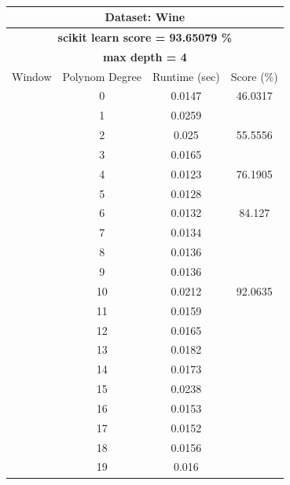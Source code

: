 \documentclass{article}
\begin{document}
\begin{multicols}{2}
\begin{table}[H]
\caption{}
\label{tab:my-table}
\begin{tabular}{|c|c|c|c|}
\hline
\multicolumn{4}{|c|}{\textbf{Dataset: Wine}} \\ \hline
\multicolumn{4}{|c|}{\textbf{scikit learn score = 93.65079 \%}} \\ \hline
\multicolumn{4}{|c|}{\textbf{max depth = 4}} \\ \hline
Window & Polynom Degree & Runtime (sec) & Score (\%) \\ \hline
 & 0 & 0.0147 & 46.0317 \\ \cline{2-4} 
 & 1 & 0.0259 &  \\ \cline{2-3}
 & 2 & 0.025 & \multirow{-2}{*}{55.5556} \\ \cline{2-4} 
 & 3 & 0.0165 &  \\ \cline{2-3}
 & 4 & 0.0123 & \multirow{-2}{*}{76.1905} \\ \cline{2-4} 
 & 5 & 0.0128 &  \\ \cline{2-3}
 & 6 & 0.0132 & \multirow{-2}{*}{84.127} \\ \cline{2-4} 
 & 7 & 0.0134 &  \\ \cline{2-3}
 & 8 & 0.0136 &  \\ \cline{2-3}
 & 9 & 0.0136 &  \\ \cline{2-3}
 & 10 & 0.0212 & \multirow{-4}{*}{92.0635} \\ \cline{2-4} 
 & \cellcolor[HTML]{FFFFC7}11 & \cellcolor[HTML]{FFFFC7}0.0159 & \cellcolor[HTML]{FFFFC7} \\ \cline{2-3}
 & 12 & 0.0165 & \cellcolor[HTML]{FFFFC7} \\ \cline{2-3}
 & 13 & 0.0182 & \cellcolor[HTML]{FFFFC7} \\ \cline{2-3}
 & 14 & 0.0173 & \cellcolor[HTML]{FFFFC7} \\ \cline{2-3}
 & 15 & 0.0238 & \cellcolor[HTML]{FFFFC7} \\ \cline{2-3}
 & 16 & 0.0153 & \cellcolor[HTML]{FFFFC7} \\ \cline{2-3}
 & 17 & 0.0152 & \cellcolor[HTML]{FFFFC7} \\ \cline{2-3}
 & 18 & 0.0156 & \cellcolor[HTML]{FFFFC7} \\ \cline{2-3}
 & 19 & 0.016 & \cellcolor[HTML]{FFFFC7} \\ \cline{2-3}

\end{tabular}
\end{table}
\end{multicols}
\end{document}
